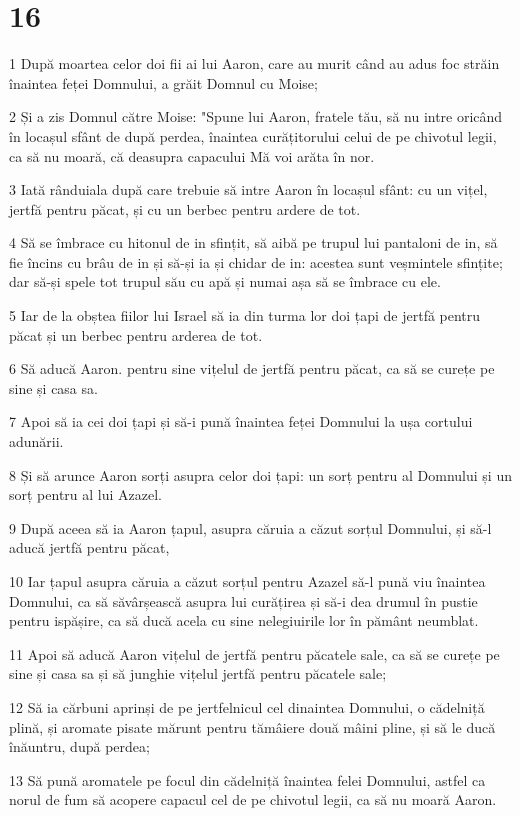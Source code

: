 \chapter{16}

\par 1 După moartea celor doi fii ai lui Aaron, care au murit când au adus foc străin înaintea feței Domnului, a grăit Domnul cu Moise;
\par 2 Și a zis Domnul către Moise: "Spune lui Aaron, fratele tău, să nu intre oricând în locașul sfânt de după perdea, înaintea curățitorului celui de pe chivotul legii, ca să nu moară, că deasupra capacului Mă voi arăta în nor.
\par 3 Iată rânduiala după care trebuie să intre Aaron în locașul sfânt: cu un vițel, jertfă pentru păcat, și cu un berbec pentru ardere de tot.
\par 4 Să se îmbrace cu hitonul de in sfințit, să aibă pe trupul lui pantaloni de in, să fie încins cu brâu de in și să-și ia și chidar de in: acestea sunt veșmintele sfințite; dar să-și spele tot trupul său cu apă și numai așa să se îmbrace cu ele.
\par 5 Iar de la obștea fiilor lui Israel să ia din turma lor doi țapi de jertfă pentru păcat și un berbec pentru arderea de tot.
\par 6 Să aducă Aaron. pentru sine vițelul de jertfă pentru păcat, ca să se curețe pe sine și casa sa.
\par 7 Apoi să ia cei doi țapi și să-i pună înaintea feței Domnului la ușa cortului adunării.
\par 8 Și să arunce Aaron sorți asupra celor doi țapi: un sorț pentru al Domnului și un sorț pentru al lui Azazel.
\par 9 După aceea să ia Aaron țapul, asupra căruia a căzut sorțul Domnului, și să-l aducă jertfă pentru păcat,
\par 10 Iar țapul asupra căruia a căzut sorțul pentru Azazel să-l pună viu înaintea Domnului, ca să săvârșească asupra lui curățirea și să-i dea drumul în pustie pentru ispășire, ca să ducă acela cu sine nelegiuirile lor în pământ neumblat.
\par 11 Apoi să aducă Aaron vițelul de jertfă pentru păcatele sale, ca să se curețe pe sine și casa sa și să junghie vițelul jertfă pentru păcatele sale;
\par 12 Să ia cărbuni aprinși de pe jertfelnicul cel dinaintea Domnului, o cădelniță plină, și aromate pisate mărunt pentru tămâiere două mâini pline, și să le ducă înăuntru, după perdea;
\par 13 Să pună aromatele pe focul din cădelniță înaintea felei Domnului, astfel ca norul de fum să acopere capacul cel de pe chivotul legii, ca să nu moară Aaron.
